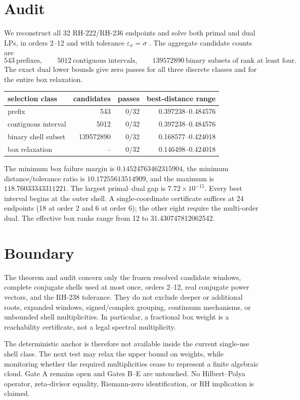 \documentclass[11pt]{article}
\begin{document}
\section{Audit}

We reconstruct all 32 RH-222/RH-236 endpoints and solve both primal and dual
LPs, in orders 2--12 and with tolerance $\varepsilon_\sigma=\sigma$
\citep{WangRH222,WangRH236}.  The aggregate candidate counts are
\[
 543\ \text{prefixes},\qquad 5012\ \text{contiguous intervals},\qquad
 139572890\ \text{binary subsets of rank at least four}.
\]
The exact dual lower bounds give zero passes for all three discrete classes
and for the entire box relaxation.

\begin{center}
\small
\begin{tabular}{lrrr}
\toprule
selection class & candidates & passes & best-distance range\\
\midrule
prefix & 543 & 0/32 & 0.397238--0.484576\\
contiguous interval & 5012 & 0/32 & 0.397238--0.484576\\
binary shell subset & 139572890 & 0/32 & 0.168577--0.424018\\
box relaxation & -- & 0/32 & 0.146498--0.424018\\
\bottomrule
\end{tabular}
\end{center}

The minimum box failure margin is
$0.14524763462315904$, the minimum distance/tolerance ratio is
$10.17255613514909$, and the maximum is $118.76033343311221$.  The largest
primal--dual gap is $7.72\times10^{-15}$.  Every best interval begins at the
outer shell.  A single-coordinate certificate suffices at 24 endpoints (18
at order 2 and 6 at order 6); the other eight require the multi-order dual.
The effective box ranks range from 12 to 31.430747812062542.

\section{Boundary}

The theorem and audit concern only the frozen resolved candidate windows,
complete conjugate shells used at most once, orders 2--12, real conjugate
power vectors, and the RH-238 tolerance.  They do not exclude deeper or
additional roots, expanded windows, signed/complex grouping, continuum
mechanisms, or unbounded shell multiplicities.  In particular, a fractional
box weight is a reachability certificate, not a legal spectral multiplicity.

The deterministic anchor is therefore not available inside the current
single-use shell class.  The next test may relax the upper bound on weights,
while monitoring whether the required multiplicities cease to represent a
finite algebraic cloud.  Gate A remains open and Gates B--E are untouched.
No Hilbert--Polya operator, zeta-divisor equality, Riemann-zero
identification, or RH implication is claimed.



\end{document}
